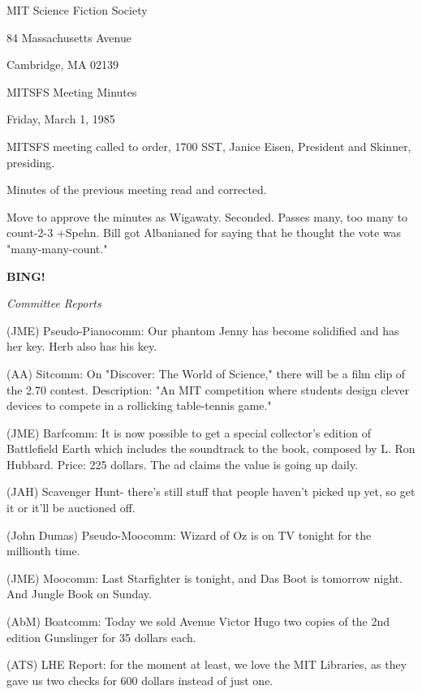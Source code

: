 \documentclass[12pt]{article}
\newcommand{\bing}{{\bf BING!} }
\newcommand{\goto}[1]{\bing \vskip 12pt \centerline{{\em{#1}}}}
\begin{document}
\begin{center}

MIT Science Fiction Society 

84 Massachusetts Avenue

Cambridge, MA 02139

\vspace{12pt}

MITSFS Meeting Minutes 

Friday, March 1, 1985

\end{center}
 
\vspace{18pt}

\setlength{\parskip}{6pt}

\noindent
MITSFS meeting called to order, 1700 SST,
Janice Eisen, President and Skinner, presiding.

Minutes of the previous meeting read and corrected.

Move to approve the minutes as Wigawaty. Seconded. Passes many, too many to count-2-3 +Spehn. Bill got Albanianed for saying that he thought the vote was "many-many-count."

\goto{Committee Reports}

(JME) Pseudo-Pianocomm: Our phantom Jenny has become solidified and has her key. Herb also has his key.

(AA) Sitcomm: On "Discover: The World of Science," there will be a film clip of the 2.70 contest. Description: "An MIT competition where students design clever devices to compete in a rollicking table-tennis game."

(JME) Barfcomm: It is now possible to get a special collector's edition of Battlefield Earth which includes the soundtrack to the book, composed by L. Ron Hubbard. Price: 225 dollars. The ad claims the value is going up daily.

(JAH) Scavenger Hunt- there's still stuff that people haven't picked up yet, so get it or it'll be auctioned off.

(John Dumas) Pseudo-Moocomm: Wizard of Oz is on TV tonight for the millionth time.

(JME) Moocomm: Last Starfighter is tonight, and Das Boot is tomorrow night. And Jungle Book on Sunday.

(AbM) Boatcomm: Today we sold Avenue Victor Hugo two copies of the 2nd edition Gunslinger for 35 dollars each.

(ATS) LHE Report: for the moment at least, we love the MIT Libraries, as they gave us two checks for 600 dollars instead of just one.
\end{document}
